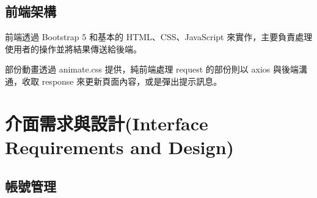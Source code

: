 \documentclass{article}
\begin{document}
\subsection{前端架構}

前端透過 Bootstrap 5 和基本的 HTML、CSS、JavaScript 來實作，主要負責處理使用者的操作並將結果傳送給後端。

部份動畫透過 animate.css 提供，純前端處理 request 的部份則以 axios 與後端溝通，收取 response 來更新頁面內容，或是彈出提示訊息。

\newpage

\section[介面需求與設計(INTERFACE REQUIREMENTS AND DESIGN)]{介面需求與設計(Interface Requirements and Design)}

\newcommand{\IRTable}[6]{
	\begin{tabularx}{0.95\textwidth}{|c|Y|Y|}
		\hline
		\rowcolor{LightGray} 介面名稱              & 介面提供者                & 介面使用者                 \\
		\rowcolor{LightGray} (Interface Name)  & (Interface Provider) & (Interface Consumer)  \\ \hline
		#1                                     & #2                   & #3                    \\ \hline
		\rowcolor{LightGray} 連結方式              & 輸入資料                 & 輸出資料                  \\
		\rowcolor{LightGray} (Connection Type) & (Input Data)         & (Output Data)         \\ \hline
		\texttt{#4}                            & \usebox\jsoninputbox & \usebox\jsonoutputbox \\ \hline
		\rowcolor{LightGray} \multicolumn{3}{|c|}{ URL }                                      \\ \hline
		\multicolumn{3}{|c|}{\texttt{#5}}                                                     \\ \hline
		\rowcolor{LightGray} \multicolumn{3}{|c|}{  介面描述 (Interface Description) }            \\ \hline
		\multicolumn{3}{|c|}{#6}                                                              \\ \hline
	\end{tabularx}
}

\subsection{帳號管理}
\end{document}
